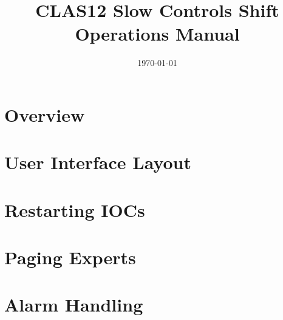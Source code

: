\documentclass[amsmath,amssymb,notitlepage,11pt]{revtex4}
\begin{document}
\title{CLAS12 Slow Controls Shift Operations Manual}
\date{\today}
\begin{abstract}
\end{abstract}

\maketitle
\tableofcontents
\newpage

\section{Overview}

\section{User Interface Layout}

\section{Restarting IOCs}

\section{Paging Experts}

\section{Alarm Handling}

%
\end{document}
